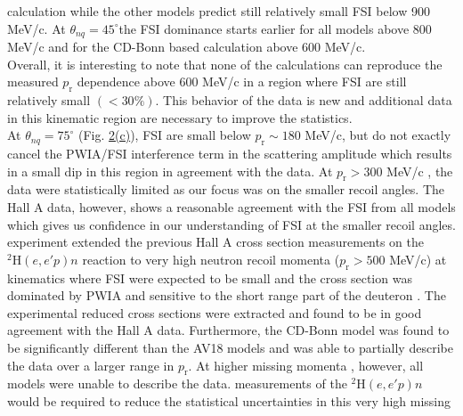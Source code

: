 calculation while the other models predict still relatively small FSI below 900 MeV/c.
At $\theta_{nq}=45^{\circ}$\DIFaddbegin \DIFadd{, }\DIFaddend the FSI dominance starts earlier for all models above 800 MeV/c and for the \DIFaddbegin {}\DIFaddend CD-Bonn based calculation above 600 MeV/c. \\
\indent Overall, it is interesting to note that none of the calculations can reproduce the measured $p_{\mathrm{r}}$ dependence above 600 MeV/c in a
region where FSI are still relatively small $(<30\%)$. This behavior of the data is new and additional data in this kinematic region are necessary
to improve the statistics. \\
\indent At $\theta_{nq}=75^{\circ}$ (Fig. \hyperref[fig:fig2]{2(c)}), FSI are small below $p_{\mathrm{r}}\sim180$ MeV/c, but do not exactly cancel the PWIA/FSI interference term in the scattering amplitude which results in a small dip in this region in agreement with the data.
At $p_{\mathrm{r}}>300$ MeV/c \DIFaddbegin {}\DIFaddend , the data were statistically limited as our focus was on the smaller recoil angles. The Hall A data, however, shows a reasonable agreement with the FSI from all models which gives us confidence in our understanding
of FSI at the smaller recoil angles. \\
\indent \DIFdelbegin {}\DIFdelend \DIFaddbegin {}\DIFaddend experiment extended the previous Hall A cross section measurements on the $^{2}\mathrm{H}(e,e'p)n$ reaction to 
very high neutron recoil momenta ($p_{\mathrm{r}}>500$ MeV/c) at kinematics where FSI were expected to be small and the cross section was dominated by PWIA and sensitive to the
short range part of the deuteron \DIFdelbegin {}\DIFdelend \DIFaddbegin {}\DIFaddend . The experimental reduced cross sections were extracted and found to be in good agreement with the Hall A data.
Furthermore, the \DIFaddbegin {}\DIFaddend CD-Bonn model was found to be significantly different than the \DIFdelbegin {}\DIFdelend \DIFaddbegin {}\DIFaddend AV18 \DIFaddbegin {}\DIFaddend models and was able to partially describe the data over a larger range in $p_{\mathrm{r}}$.
At higher missing momenta \DIFaddbegin {}\DIFaddend , however, all models were unable to describe the data. 
\DIFdelbegin %
\DIFdelend \DIFaddbegin {}\DIFaddend measurements of the $^{2}\mathrm{H}(e,e'p)n$ would be required to reduce the statistical uncertainties in this very high missing
